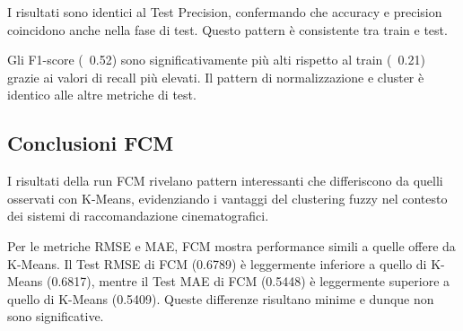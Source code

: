 I risultati sono identici al Test Precision, confermando che accuracy e precision coincidono anche nella fase di test. Questo pattern è consistente tra train e test.

\begin{table}[H]
  \centering
  \caption{Top 5 Configurazioni per Test F1-Score - Run FCM}
\end{table}

Gli F1-score (~0.52) sono significativamente più alti rispetto al train (~0.21) grazie ai valori di recall più elevati. Il pattern di normalizzazione e cluster è identico alle altre metriche di test.

\subsection{Conclusioni FCM}

I risultati della run FCM rivelano pattern interessanti che differiscono da quelli osservati con K-Means, evidenziando i vantaggi del clustering fuzzy nel contesto dei sistemi di raccomandazione cinematografici.

Per le metriche RMSE e MAE, FCM mostra performance simili a quelle offere da K-Means. Il Test RMSE di FCM (0.6789) è leggermente inferiore a quello di K-Means (0.6817), mentre il Test MAE di FCM (0.5448) è leggermente superiore a quello di K-Means (0.5409). Queste differenze risultano minime e dunque non sono significative.

